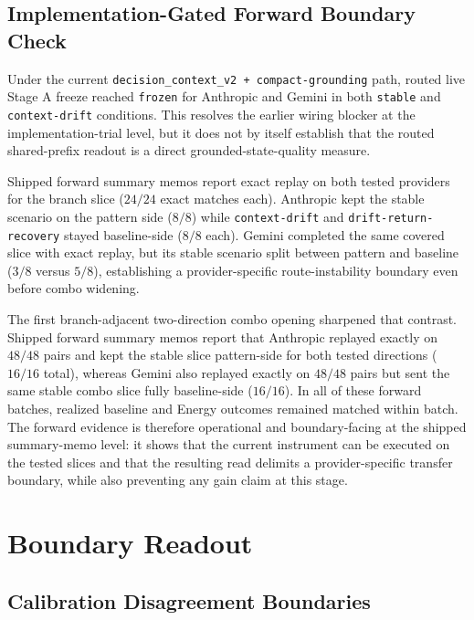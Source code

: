 \documentclass[11pt,a4paper]{article}
\begin{document}
\subsection{Implementation-Gated Forward Boundary Check}
\label{sec:forwardboundary}

Under the current \texttt{decision\_context\_v2 + compact-grounding} path, routed live Stage A freeze reached \texttt{frozen} for Anthropic and Gemini in both \texttt{stable} and \texttt{context-drift} conditions. This resolves the earlier wiring blocker at the implementation-trial level, but it does not by itself establish that the routed shared-prefix readout is a direct grounded-state-quality measure.

Shipped forward summary memos report exact replay on both tested providers for the branch slice (\(24/24\) exact matches each). Anthropic kept the stable scenario on the pattern side (\(8/8\)) while \texttt{context-drift} and \texttt{drift-return-recovery} stayed baseline-side (\(8/8\) each). Gemini completed the same covered slice with exact replay, but its stable scenario split between pattern and baseline (\(3/8\) versus \(5/8\)), establishing a provider-specific route-instability boundary even before combo widening.

The first branch-adjacent two-direction combo opening sharpened that contrast. Shipped forward summary memos report that Anthropic replayed exactly on \(48/48\) pairs and kept the stable slice pattern-side for both tested directions (\(16/16\) total), whereas Gemini also replayed exactly on \(48/48\) pairs but sent the same stable combo slice fully baseline-side (\(16/16\)). In all of these forward batches, realized baseline and Energy outcomes remained matched within batch. The forward evidence is therefore operational and boundary-facing at the shipped summary-memo level: it shows that the current instrument can be executed on the tested slices and that the resulting read delimits a provider-specific transfer boundary, while also preventing any gain claim at this stage.
\section{Boundary Readout}
\label{sec:boundaries}

\subsection{Calibration Disagreement Boundaries}
\label{sec:calibrationboundaries}
\end{document}
